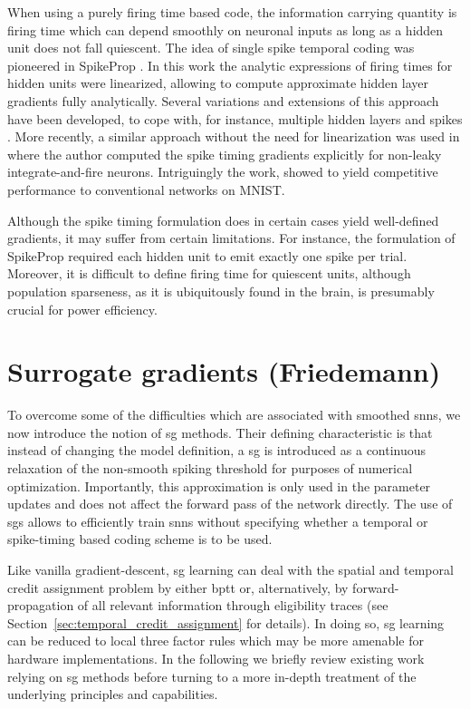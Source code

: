 \documentclass[journal,onecolumn,11pt]{IEEEtran}
\begin{document}
When using a purely firing time based code, the information carrying quantity is
firing time which can depend smoothly on neuronal inputs as long as a hidden
unit does not fall quiescent.
The idea of single spike temporal coding was 
pioneered in SpikeProp \cite{bohte_error-backpropagation_2002}.
In this work the analytic expressions of firing times for hidden units 
were linearized, allowing to compute approximate hidden layer gradients fully
analytically. 
Several variations and extensions of this approach have been developed,
to cope with, for instance, multiple hidden layers and spikes
\cite{banerjee_learning_2016}. %
More recently, a similar approach without the need for linearization 
was used in \cite{Mostafa16_supelear} where the author computed the spike timing 
gradients explicitly for non-leaky integrate-and-fire neurons. 
Intriguingly the work, showed to yield competitive performance to conventional
networks on MNIST.

Although the spike timing formulation does in certain cases
yield well-defined gradients, it may suffer from certain
limitations. 
For instance, the formulation of SpikeProp required each hidden
unit to emit exactly one spike per trial. Moreover, it is difficult to define 
firing time for quiescent units, although population sparseness, as it is
ubiquitously found in the brain, is presumably crucial for power
efficiency.


\section{Surrogate gradients (Friedemann)}

To overcome some of the difficulties which are associated with smoothed \glspl{snn}, we now introduce the notion of \gls{sg} methods.
Their defining characteristic is that instead of changing the model definition, a \gls{sg} is introduced as a continuous relaxation of the non-smooth spiking threshold for purposes of numerical optimization.
Importantly, this approximation is only used in the parameter updates and does not affect the forward pass of the network directly.
The use of \glspl{sg} allows to efficiently train \glspl{snn} without specifying whether a temporal or spike-timing based coding scheme is to be used. 

Like vanilla gradient-descent, \gls{sg} learning can deal with the spatial and temporal credit assignment problem by either \gls{bptt} or, alternatively, by forward-propagation of all relevant information through eligibility traces (see Section~\ref{sec:temporal_credit_assignment} for details). 
In doing so, \gls{sg} learning can be reduced to local three factor rules which may be more amenable for hardware implementations. 
In the following we briefly review existing work relying on \gls{sg} methods before turning to a more in-depth treatment of the underlying principles and capabilities. 
\end{document}
